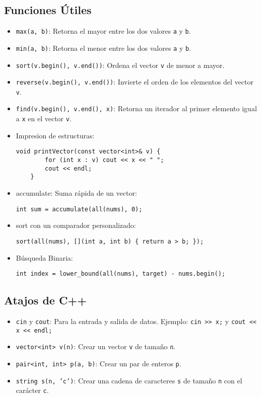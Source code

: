 \subsection{Funciones Útiles}

\begin{itemize}
    \item \texttt{max(a, b)}: Retorna el mayor entre los dos valores \texttt{a} y \texttt{b}.
    \item \texttt{min(a, b)}: Retorna el menor entre los dos valores \texttt{a} y \texttt{b}.
    \item \texttt{sort(v.begin(), v.end())}: Ordena el vector \texttt{v} de menor a mayor.
    \item \texttt{reverse(v.begin(), v.end())}: Invierte el orden de los elementos del vector \texttt{v}.
    \item \texttt{find(v.begin(), v.end(), x)}: Retorna un iterador al primer elemento igual a \texttt{x} en el vector \texttt{v}.
    \item Impresion de estructuras:
    \begin{lstlisting}[style=cpp]
    void printVector(const vector<int>& v) {
        for (int x : v) cout << x << " ";
        cout << endl;
    }
    \end{lstlisting}
    \item accumulate: Suma rápida de un vector:
    \begin{lstlisting}[style=cpp]
    int sum = accumulate(all(nums), 0);
    \end{lstlisting}
    \item sort con un comparador personalizado:
    \begin{lstlisting}[style=cpp]
    sort(all(nums), [](int a, int b) { return a > b; });
    \end{lstlisting}
    \item Búsqueda Binaria:
    \begin{lstlisting}[style=cpp]
    int index = lower_bound(all(nums), target) - nums.begin();
    \end{lstlisting}
\end{itemize}

\subsection{Atajos de C++}

\begin{itemize}
    \item \texttt{cin} y \texttt{cout}: Para la entrada y salida de datos. Ejemplo: \texttt{cin >> x;} y \texttt{cout << x << endl;}
    \item \texttt{vector<int> v(n)}: Crear un vector \texttt{v} de tamaño \texttt{n}.
    \item \texttt{pair<int, int> p(a, b)}: Crear un par de enteros \texttt{p}.
    \item \texttt{string s(n, 'c')}: Crear una cadena de caracteres \texttt{s} de tamaño \texttt{n} con el carácter \texttt{c}.
\end{itemize}



